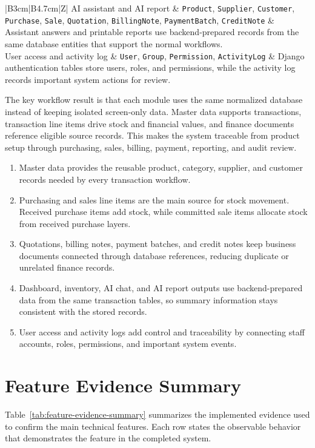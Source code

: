 \begin{table}[!htbp]
\begin{tabularx}{\textwidth}{|B{3cm}|B{4.7cm}|Z|}
		AI assistant and AI report & \texttt{Product}, \texttt{Supplier}, \texttt{Customer}, \texttt{Purchase}, \texttt{Sale}, \texttt{Quotation}, \texttt{BillingNote}, \texttt{PaymentBatch}, \texttt{CreditNote} & Assistant answers and printable reports use backend-prepared records from the same database entities that support the normal workflows. \\ \hline
		User access and activity log & \texttt{User}, \texttt{Group}, \texttt{Permission}, \texttt{ActivityLog} & Django authentication tables store users, roles, and permissions, while the activity log records important system actions for review. \\ \hline
	\end{tabularx}
\end{table}

The key workflow result is that each module uses the same normalized database instead of keeping isolated screen-only data. Master data supports transactions, transaction line items drive stock and financial values, and finance documents reference eligible source records. This makes the system traceable from product setup through purchasing, sales, billing, payment, reporting, and audit review.

\begin{enumerate}
	\item Master data provides the reusable product, category, supplier, and customer records needed by every transaction workflow.
	\item Purchasing and sales line items are the main source for stock movement. Received purchase items add stock, while committed sale items allocate stock from received purchase layers.
	\item Quotations, billing notes, payment batches, and credit notes keep business documents connected through database references, reducing duplicate or unrelated finance records.
	\item Dashboard, inventory, AI chat, and AI report outputs use backend-prepared data from the same transaction tables, so summary information stays consistent with the stored records.
	\item User access and activity logs add control and traceability by connecting staff accounts, roles, permissions, and important system events.
\end{enumerate}

\section{Feature Evidence Summary}
Table~\ref{tab:feature-evidence-summary} summarizes the implemented evidence used to confirm the main technical features. Each row states the observable behavior that demonstrates the feature in the completed system.

